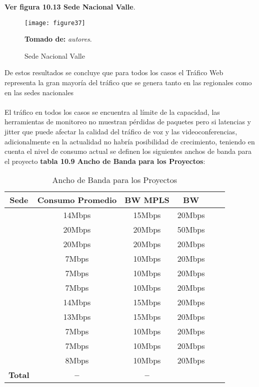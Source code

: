 \textbf{Ver figura 10.13 Sede Nacional Valle}.
\begin{figure}[htbp]
  \centering
    {\texttt{[image: figure37]}}%
  \caption{Sede Nacional Valle}
   \textbf{Tomado de:} \textit{autores}.
  \label{fig:fig2subfig}
\end{figure}

De estos resultados se concluye que para todos los casos el Tráfico Web representa la gran mayoría del tráfico que se genera tanto en las regionales como en las sedes nacionales
\\
\\
El tráfico en todos los casos se encuentra al límite de la capacidad, las herramientas de monitoreo no muestran pérdidas de paquetes pero si latencias y jitter que puede afectar la calidad del tráfico de voz y las videoconferencias, adicionalmente en la actualidad no habría posibilidad de crecimiento, teniendo en cuenta el nivel de consumo actual se definen los siguientes anchos de banda para el proyecto \textbf{tabla 10.9 Ancho de Banda para los Proyectos}:

\begin{table}[ht]
	\caption{Ancho de Banda para los Proyectos}
	\label{tab:hla:results}
\centering
\begin{tabular}{lccccc}
	\toprule
	\multicolumn{1}{c}{\textbf{Sede}} 	& \textbf{Consumo Promedio}	& \textbf{BW MPLS} & \textbf{BW}\\
	\midrule
\cite{Nacional Medellin} 		& 14Mbps & 15Mbps  & 20Mbps \\
\cite{Antioquia Norte} 		& 20Mbps & 20Mbps & 50Mbps\\
\cite{Nacional Tocancipa} 		& 20Mbps & 20Mbps & 20Mbps \\
\cite{Soacha} 		& 7Mbps & 10Mbps & 20Mbps \\
\cite{Antioquia Sur} 		& 7Mbps & 10Mbps & 20Mbps \\
\cite{Antioquia Oriente} 		& 7Mbps & 10Mbps & 20Mbps \\
\cite{Eje Cafetero} 		& 14Mbps & 15Mbps & 20Mbps \\
\cite{Valle} 		& 13Mbps & 15Mbps & 20Mbps \\
\cite{Cota} 		& 7Mbps & 10Mbps & 20Mbps \\
\cite{Bucaramanga} 		& 7Mbps & 10Mbps & 20Mbps \\
\cite{Funza} 		& 8Mbps & 10Mbps & 20Mbps \\
	\midrule
	\textbf{Total}			& \textbf{--}		& \textbf{--} \\
	\bottomrule
\end{tabular}
\end{table}

